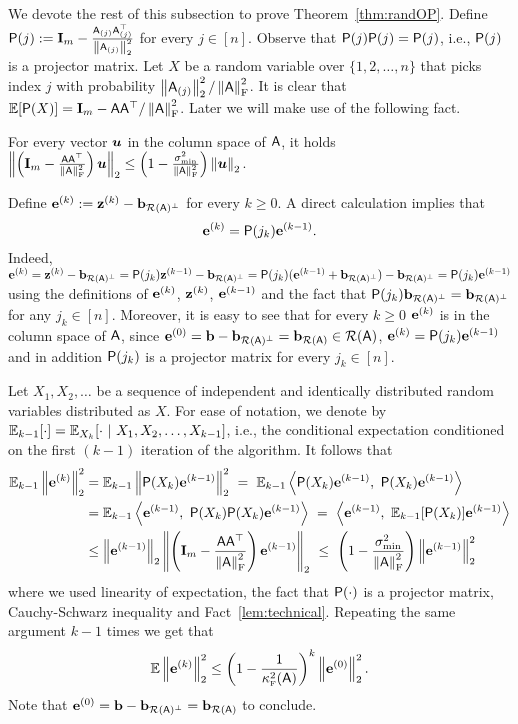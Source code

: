 %
We devote the rest of this subsection to prove Theorem~\ref{thm:randOP}. Define $\matP (j):= \Id_m - \frac{\ac{j} \ac{j}^\top}{\norm{\ac{j}}^2}$ for every $j\in [n]$. Observe that $\matP (j) \matP (j) = \matP (j)$, i.e., $\matP (j)$ is a projector matrix. Let $X$ be a random variable over $\{1,2,\ldots, n\}$ that picks index $j$ with probability $\norm{\ac{j}}^2/\frobnorm{\matA}^2$. It is clear that $\EE [\matP(X)] = \Id_m - \matA\matA^\top /\frobnorm{\matA}^2$. Later we will make use of the following fact.
%
%
\begin{fact}\label{lem:technical}
For every vector $\vecu$ in the column space of $\matA$, it holds $\norm{\left(\Id_m - \frac{\matA\matA^\top }{\frobnorm{\matA}^2}\right) \vecu} \leq \left(1 - \frac{\sigma^2_{\min}}{\frobnorm{\matA}^2} \right) \norm{\vecu}$.
\end{fact}
%
%

%
Define $\e^{(k)}:= \z^{(k)} - \bc$ for every $k\geq 0$. A direct calculation implies that
\[\e^{(k)} = \matP (j_k) \e^{(k-1)}.\]
Indeed, $\e^{(k)} = \z^{(k)} - \bc = \matP(j_k) \z^{(k-1)} - \bc = \matP(j_k) (\e^{(k-1)} + \bc ) - \bc = \matP(j_k) \e^{(k-1)}$ using the definitions of $\e^{(k)}$, $\z^{(k)}$, $\e^{(k-1)}$ and the fact that $\matP (j_k) \bc = \bc$ for any $j_k\in{[n]}$. Moreover, it is easy to see that for every $k\geq0$ $\e^{(k)}$ is in the column space of $\matA$, since $\e^{(0)} = \b - \bc = \br\in \colspan{\matA} $, $\e^{(k)}= \matP (j_k) \e^{(k-1)}$ and in addition $\matP(j_k)$ is a projector matrix for every $j_k\in [n]$.

Let $X_1,X_2,\ldots $ be a sequence of independent and identically distributed random variables distributed as $X$. For ease of notation, we denote by $\EE_{k-1}[\cdot] = \EE_{X_k} [\cdot\ |\ X_1, X_2, \ldots, X_{k-1}]$, i.e., the conditional expectation conditioned on the first $(k-1)$ iteration of the algorithm. It follows that
\begin{align*}
	\EE_{k-1} \norm{ \e^{(k)}}^2 &  =   \EE_{k-1} \norm{ \matP (X_k) \e^{(k-1)} }^2 \ = \ \EE_{k-1} \ip{ \matP (X_k) \e^{(k-1)} }{ \matP (X_k) \e^{(k-1)} } \\
							 &  =   \EE_{k-1} \ip{\e^{(k-1)} }{ \matP (X_k)\matP (X_k) \e^{(k-1)} } \ = \  \ip{\e^{(k-1)} }{ \EE_{k-1} [\matP (X_k)] \e^{(k-1)} } \\
							 &\leq  \norm{\e^{(k-1)}} \norm{ \left(\Id_m - \frac{\matA\matA^\top }{\frobnorm{\matA}^2}\right) \e^{(k-1)} }
							 \ \leq \ \left(1 - \frac{\sigma^2_{\min}}{\frobnorm{\matA}^2}\right) \norm{\e^{(k-1)}}^2
\end{align*}
where we used linearity of expectation, the fact that $\matP (\cdot)$ is a projector matrix, Cauchy-Schwarz inequality and Fact~\ref{lem:technical}. Repeating the same argument $k-1$ times we get that
\[\EE\norm{ \e^{(k)}}^2 \leq \left(1 -  \frac1{\kappaFS(\matA)}\right)^k \norm{\e^{(0)}}^2.\]
%
Note that $\e^{(0)} = \b - \bc = \br$ to conclude.
%

